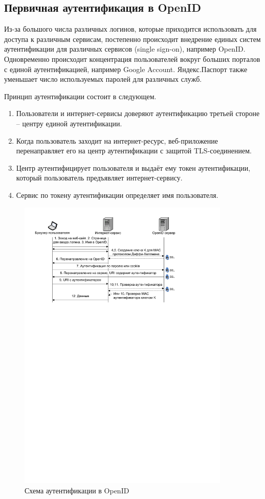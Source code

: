 \subsection{Первичная аутентификация в OpenID}

Из-за большого числа различных логинов, которые приходится использовать для доступа к различным сервисам, постепенно происходит внедрение единых систем аутентификации для различных сервисов (single sign-on), например OpenID. Одновременно происходит концентрация пользователей вокруг больших порталов с единой аутентификацией, например Google Account. Яндекс.Паспорт также уменьшает число используемых паролей для различных служб.

Принцип аутентификации состоит в следующем.
\begin{enumerate}
    \item Пользователи и интернет-сервисы доверяют аутентификацию третьей стороне -- центру единой аутентификации.
    \item Когда пользователь заходит на интернет-ресурс, веб-при\-ло\-же\-ние перенаправляет его на центр аутентификации с защитой TLS-соединением.
    \item Центр аутентифицирует пользователя и выдаёт ему токен аутентификации, который пользователь предъявляет ин\-тер\-нет-сер\-ви\-су.
    \item Сервис по токену аутентификации определяет имя пользователя.
\end{enumerate}

\begin{figure}[!ht]
	\centering
	\includegraphics[width=0.9\textwidth]{pic/openid}
	\caption{Схема аутентификации в OpenID\label{fig:openid}}
\end{figure}

